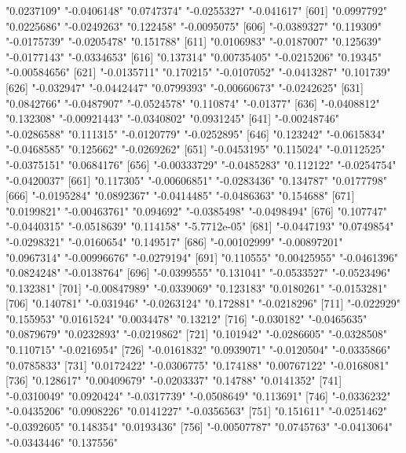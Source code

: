 \begin{Schunk}
\begin{Soutput}
[596] "0.0237109"    "-0.0406148"   "0.0747374"    "-0.0255327"   "-0.041617"   
[601] "0.0997792"    "0.0225686"    "-0.0249263"   "0.122458"     "-0.0095075"  
[606] "-0.0389327"   "0.119309"     "-0.0175739"   "-0.0205478"   "0.151788"    
[611] "0.0106983"    "-0.0187007"   "0.125639"     "-0.0177143"   "-0.0334653"  
[616] "0.137314"     "0.00735405"   "-0.0215206"   "0.19345"      "-0.00584656" 
[621] "-0.0135711"   "0.170215"     "-0.0107052"   "-0.0413287"   "0.101739"    
[626] "-0.032947"    "-0.0442447"   "0.0799393"    "-0.00660673"  "-0.0242625"  
[631] "0.0842766"    "-0.0487907"   "-0.0524578"   "0.110874"     "-0.01377"    
[636] "-0.0408812"   "0.132308"     "-0.00921443"  "-0.0340802"   "0.0931245"   
[641] "-0.00248746"  "-0.0286588"   "0.111315"     "-0.0120779"   "-0.0252895"  
[646] "0.123242"     "-0.0615834"   "-0.0468585"   "0.125662"     "-0.0269262"  
[651] "-0.0453195"   "0.115024"     "-0.0112525"   "-0.0375151"   "0.0684176"   
[656] "-0.00333729"  "-0.0485283"   "0.112122"     "-0.0254754"   "-0.0420037"  
[661] "0.117305"     "-0.00606851"  "-0.0283436"   "0.134787"     "0.0177798"   
[666] "-0.0195284"   "0.0892367"    "-0.0414485"   "-0.0486363"   "0.154688"    
[671] "0.0199821"    "-0.00463761"  "0.094692"     "-0.0385498"   "-0.0498494"  
[676] "0.107747"     "-0.0440315"   "-0.0518639"   "0.114158"     "-5.7712e-05" 
[681] "-0.0447193"   "0.0749854"    "-0.0298321"   "-0.0160654"   "0.149517"    
[686] "-0.00102999"  "-0.00897201"  "0.0967314"    "-0.00996676"  "-0.0279194"  
[691] "0.110555"     "0.00425955"   "-0.0461396"   "0.0824248"    "-0.0138764"  
[696] "-0.0399555"   "0.131041"     "-0.0533527"   "-0.0523496"   "0.132381"    
[701] "-0.00847989"  "-0.0339069"   "0.123183"     "0.0180261"    "-0.0153281"  
[706] "0.140781"     "-0.031946"    "-0.0263124"   "0.172881"     "-0.0218296"  
[711] "-0.022929"    "0.155953"     "0.0161524"    "0.0034478"    "0.13212"     
[716] "-0.030182"    "-0.0465635"   "0.0879679"    "0.0232893"    "-0.0219862"  
[721] "0.101942"     "-0.0286605"   "-0.0328508"   "0.110715"     "-0.0216954"  
[726] "-0.0161832"   "0.0939071"    "-0.0120504"   "-0.0335866"   "0.0785833"   
[731] "0.0172422"    "-0.0306775"   "0.174188"     "0.00767122"   "-0.0168081"  
[736] "0.128617"     "0.00409679"   "-0.0203337"   "0.14788"      "0.0141352"   
[741] "-0.0310049"   "0.0920424"    "-0.0317739"   "-0.0508649"   "0.113691"    
[746] "-0.0336232"   "-0.0435206"   "0.0908226"    "0.0141227"    "-0.0356563"  
[751] "0.151611"     "-0.0251462"   "-0.0392605"   "0.148354"     "0.0193436"   
[756] "-0.00507787"  "0.0745763"    "-0.0413064"   "-0.0343446"   "0.137556"    

\end{Soutput}
\end{Schunk}
